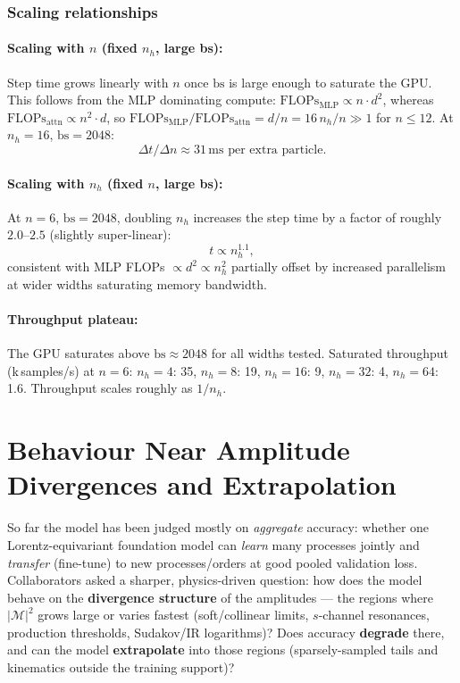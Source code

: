 \subsubsection{Scaling relationships}

\paragraph{Scaling with $n$ (fixed $n_h$, large bs):}
Step time grows linearly with $n$ once $\mathrm{bs}$ is large
enough to saturate the GPU.
This follows from the MLP dominating compute:
$\mathrm{FLOPs}_\text{MLP} \propto n\cdot d^2$, whereas
$\mathrm{FLOPs}_\text{attn} \propto n^2 \cdot d$,
so $\mathrm{FLOPs}_\text{MLP}/\mathrm{FLOPs}_\text{attn}
= d/n = 16\,n_h/n \gg 1$ for $n \leq 12$.
At $n_h=16$, $\mathrm{bs}=2048$:
\[
  \Delta t / \Delta n \approx 31\,\text{ms per extra particle}.
\]

\paragraph{Scaling with $n_h$ (fixed $n$, large bs):}
At $n=6$, $\mathrm{bs}=2048$, doubling $n_h$ increases the step
time by a factor of roughly $2.0$--$2.5$ (slightly super-linear):
\[
  t \propto n_h^{1.1},
\]
consistent with MLP FLOPs $\propto d^2 \propto n_h^2$ partially
offset by increased parallelism at wider widths saturating memory
bandwidth.

\paragraph{Throughput plateau:}
The GPU saturates above $\mathrm{bs}\approx 2048$ for all widths
tested.  Saturated throughput (k\,samples/s) at $n=6$:
$n_h=4$: 35, $n_h=8$: 19, $n_h=16$: 9, $n_h=32$: 4,
$n_h=64$: 1.6.
Throughput scales roughly as $1/n_h$.



\section{Behaviour Near Amplitude Divergences and Extrapolation}

So far the model has been judged mostly on \emph{aggregate} accuracy: whether one
Lorentz-equivariant foundation model can \emph{learn} many processes jointly and
\emph{transfer} (fine-tune) to new processes/orders at good pooled validation loss.
Collaborators asked a sharper, physics-driven question: how does the model behave on
the \textbf{divergence structure} of the amplitudes --- the regions where
$|\mathcal{M}|^2$ grows large or varies fastest (soft/collinear limits, $s$-channel
resonances, production thresholds, Sudakov/IR logarithms)?  Does accuracy
\textbf{degrade} there, and can the model \textbf{extrapolate} into those regions
(sparsely-sampled tails and kinematics outside the training support)?

